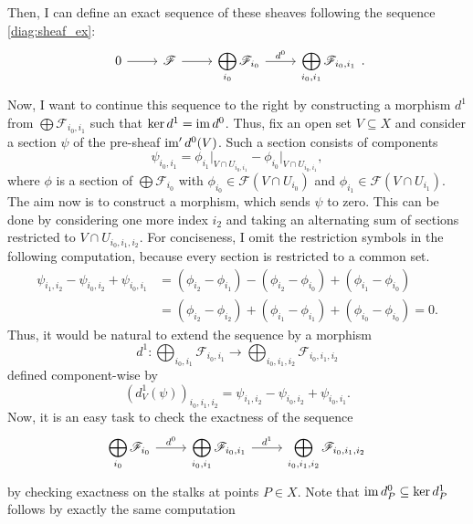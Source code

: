 Then, I can define an exact sequence of these sheaves following the sequence
\eqref{diag:sheaf_ex}:
\[\begin{tikzcd}
    0\rar & \mathscr{F}\rar
    & \displaystyle\bigoplus_{i_{0}}\mathscr{F}_{i_{0}}\rar{d^{0}}
    & \displaystyle\bigoplus_{i_{0},i_{1}}\mathscr{F}_{i_{0},i_{1}}
  \end{tikzcd}.\]
Now, I want to continue this sequence to the right by constructing a
morphism $d^{1}$ from $\displaystyle\bigoplus\mathscr{F}_{i_{0},i_{1}}$
such that $\ker d^{1}=\operatorname{im} d^{0}$. Thus, fix an open set $V\subseteq X$ and
consider a section $\psi$ of the pre-sheaf $\operatorname{im}^{\prime} d^{0}(V)$. Such a
section consists of components
\[
  \psi_{i_{0},i_{1}}=\phi_{i_{1}}\vert_{V\cap U_{i_{0},i_{1}}}
  -\phi_{i_{0}}\vert_{V\cap U_{i_{0},i_{1}}},
\] %
where $\phi$ is a section of $\displaystyle\bigoplus\mathscr{F}_{i_{0}}$ with
$\phi_{i_{0}}\in\mathscr{F}(V\cap U_{i_{0}})$ and
$\phi_{i_{1}}\in\mathscr{F}(V\cap U_{i_{1}})$. The aim now is to construct a
morphism, which sends $\psi$ to zero. This can be done by considering one
more index $i_{2}$ and taking an alternating sum of sections restricted to
$V\cap U_{i_{0},i_{1},i_{2}}$. For conciseness, I omit the restriction symbols
in the following computation, because every section is restricted to a
common set.
\begin{align*}
  \psi_{i_{1},i_{2}}-\psi_{i_{0},i_{2}}+\psi_{i_{0},i_{1}}
  &=(\phi_{i_{2}}-\phi_{i_{1}})-(\phi_{i_{2}}-\phi_{i_{0}})
    +(\phi_{i_{1}}-\phi_{i_{0}}) \\
  &=(\phi_{i_{2}}-\phi_{i_{2}})+(\phi_{i_{1}}-\phi_{i_{1}})
    +(\phi_{i_{0}}-\phi_{i_{0}})=0.
\end{align*}
Thus, it would be natural to extend the sequence by a morphism
\[
  d^{1}:\bigoplus_{i_{0},i_{1}}\mathscr{F}_{i_{0},i_{1}}
  \to\bigoplus_{i_{0},i_{1},i_{2}}\mathscr{F}_{i_{0},i_{1},i_{2}}
\]
defined component-wise by
\[
  \left(d^{1}_{V}(\psi)\right)_{i_{0},i_{1},i_{2}}=
  \psi_{i_{1},i_{2}}-\psi_{i_{0},i_{2}}+\psi_{i_{0},i_{1}}.
\]
Now, it is an easy task to check the exactness of the sequence
\[\begin{tikzcd}
    \displaystyle\bigoplus_{i_{0}}\mathscr{F}_{i_{0}}\rar{d^{0}}
    & \displaystyle\bigoplus_{i_{0},i_{1}}\mathscr{F}_{i_{0},i_{1}}\rar{d^{1}}
    & \displaystyle\bigoplus_{i_{0},i_{1},i_{2}}\mathscr{F}_{i_{0},i_{1},i_{2}}
  \end{tikzcd}\]
by checking exactness on the stalks at points $P\in X$. Note that
$\operatorname{im} d^{0}_{P}\subseteq\ker d^{1}_{P}$ follows by exactly the same computation
